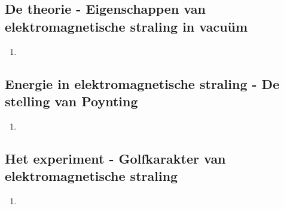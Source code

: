 \documentclass[12pt]{article}
\begin{document}
    \subsection{De theorie - Eigenschappen van elektromagnetische straling in vacuüm}
    \begin{enumerate}
        \item 
    \end{enumerate}
    \subsection{Energie in elektromagnetische straling - De stelling van Poynting}
    \begin{enumerate}
        \item 
    \end{enumerate}
    \subsection{Het experiment - Golfkarakter van elektromagnetische straling}
    \begin{enumerate}
        \item 
    \end{enumerate}
    
\end{document}
